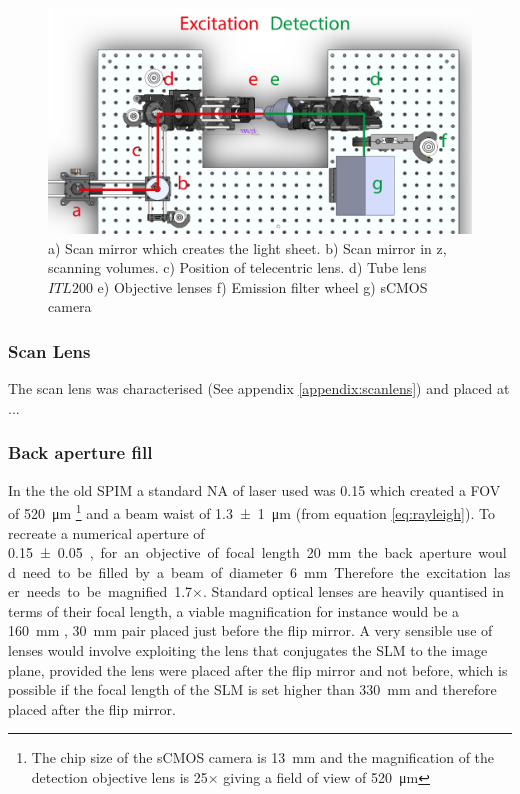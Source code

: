 \begin{figure}
	\centering
	\includegraphics[width=\linewidth]{Figures/soldiworks_top}
	\caption[Top down schematic of SPIM]{a) Scan mirror which creates the light sheet.
b) Scan mirror in z, scanning volumes. c) Position of telecentric lens. d) Tube lens $ITL200$ e) Objective lenses f) Emission filter wheel g) sCMOS camera}
	\label{fig:soldiworks_top}
\end{figure}

\subsubsection{Scan Lens}
The scan lens was characterised (See appendix \ref{appendix:scanlens}) and placed at ... %

\subsubsection{Back aperture fill}

In the the old SPIM a standard NA of laser used was 0.15 which created a FOV of \SI{520}{\micro\meter} \footnote{The chip size of the sCMOS camera is \SI{13}{\milli\meter} and the magnification of the detection objective lens is \SI{25}{}$\times$ giving a field of view of \SI{520}{\micro\meter}} and a beam waist of \SI{1.3 \pm 1}{\micro\meter} (from equation \ref{eq:rayleigh}).
To recreate a numerical aperture of \SI{0.15 \pm 0.05}, for an objective of focal length \SI{20}{\milli\meter}  the back aperture would need to be filled by a beam of diameter \SI{6}{\milli\meter}.
Therefore the excitation laser needs to be magnified \SI{1.7}{}$\times$.
Standard optical lenses are heavily quantised in terms of their focal length, a viable magnification for instance would be a \SI{160}{\milli\meter} , \SI{30}{\milli\meter} pair placed just before the flip mirror.
A very sensible use of lenses would involve exploiting the lens that conjugates the SLM to the image plane, provided the lens were placed after the flip mirror and not before, which is possible if the focal length of the SLM is set higher than \SI{330}{\milli\meter} and therefore placed after the flip mirror.

